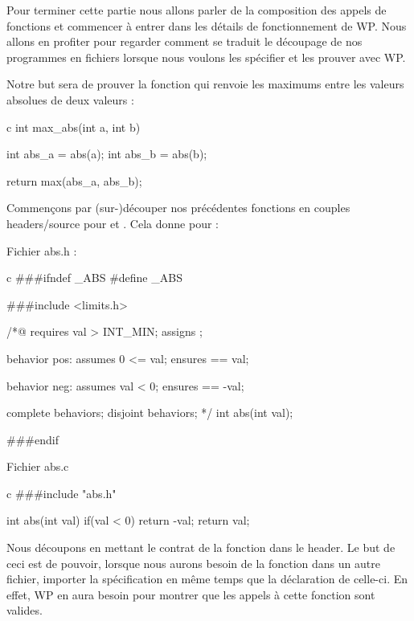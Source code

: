 Pour terminer cette partie nous allons parler de la composition des appels de
fonctions et commencer à entrer dans les détails de fonctionnement de WP. Nous
allons en profiter pour regarder comment se traduit le découpage de nos 
programmes en fichiers lorsque nous voulons les spécifier et les prouver avec WP.



Notre but sera de prouver la fonction  qui renvoie les maximums 
entre les valeurs absolues de deux valeurs :



\begin{CodeBlock}{c}
int max_abs(int a, int b){
  int abs_a = abs(a);
  int abs_b = abs(b);

  return max(abs_a, abs_b);
}
\end{CodeBlock}



Commençons par (sur-)découper nos précédentes fonctions en couples 
headers/source pour  et . Cela donne pour  :



Fichier abs.h :



\begin{CodeBlock}{c}
###ifndef _ABS
#define _ABS

###include <limits.h>

/*@
  requires val > INT_MIN;
  assigns  \nothing;

  behavior pos:
    assumes 0 <= val;
    ensures \result == val;
  
  behavior neg:
    assumes val < 0;
    ensures \result == -val;
 
  complete behaviors;
  disjoint behaviors;
*/
int abs(int val);

###endif
\end{CodeBlock}



Fichier abs.c



\begin{CodeBlock}{c}
###include "abs.h"

int abs(int val){
  if(val < 0) return -val;
  return val;
}
\end{CodeBlock}



Nous découpons en mettant le contrat de la fonction dans le header. Le but de
ceci est de pouvoir, lorsque nous aurons besoin de la fonction dans un autre 
fichier, importer la spécification en même temps que la déclaration de 
celle-ci. En effet, WP en aura besoin pour montrer que les appels à cette 
fonction sont valides.



